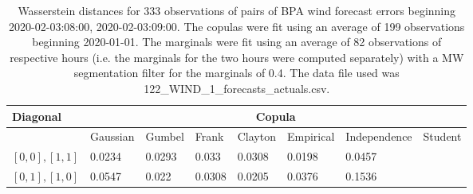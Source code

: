 \begin{table}[h] 
    \centering 
    \begin{tabular}{|l|l|l|l|l|l|l|l|} \hline 
        \textbf{Diagonal} & \multicolumn{7}{c|}{\textbf{Copula}} \\ \hline 
        & Gaussian & Gumbel & Frank & Clayton & Empirical & Independence & Student \\ \hline 
        $[0,0], [1,1]$ & 0.0234 & 0.0293 & 0.033 & 0.0308 & 0.0198 & 0.0457 &  \\ \hline 
        $[0,1], [1,0]$ & 0.0547 & 0.022 & 0.0308 & 0.0205 & 0.0376 & 0.1536 &  \\ \hline 
    \end{tabular} 
    \caption{Wasserstein distances for 333 observations of pairs of BPA wind forecast errors beginning 2020-02-03:08:00, 2020-02-03:09:00. The copulas were fit  using an average of 199 observations beginning 2020-01-01. The marginals were fit using an average of 82 observations of respective hours (i.e. the  marginals for the two hours were computed separately) with a MW segmentation filter for the marginals of 0.4. The data file used was 122\_WIND\_1\_forecasts\_actuals.csv.} 
\end{table}